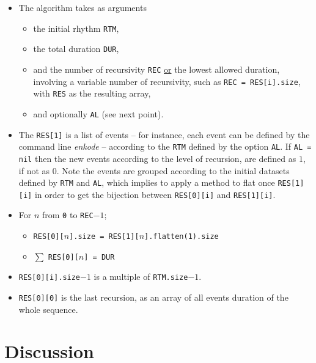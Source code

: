 \begin{itemize}[label=\textbullet]
\item The algorithm takes as arguments
\begin{itemize}[label=$\rightarrow$]
\item  the initial rhythm \texttt{RTM}, 
 \item the total duration \texttt{DUR},
 \item  and the number of recursivity \texttt{REC} \underline{or} the \hbox{lowest} allowed duration, involving a variable number of recursivity, such as \texttt{REC = RES[i].size}, with \texttt{RES} as the resulting array, 
 \item and optionally \texttt{AL} (see next point). 
 \end{itemize}
\item The \texttt{RES[1]} is a list of events -- for instance, each event can be defined by the command line \textsl{enkode}
 -- according to the \texttt{RTM} defined by the option \texttt{AL}. If \texttt{AL = nil} then the new events according to the level of recursion, are defined as $1$, if not as $0$. Note the events are grouped according to the initial datasets defined by \texttt{RTM} and \texttt{AL}, which implies to apply a method to flat once \texttt{RES[1][i]} in order to get the bijection between \texttt{RES[0][i]} and \texttt{RES[1][i]}. 
\item For $n$ from \texttt{0} to \texttt{REC$-1$};
\begin{itemize}[label=$\rightarrow$]
\item \texttt{RES[0][$n$].size = RES[1][$n$].flatten(1).size}
\item $\sum$ \texttt{RES[0][}$n$\texttt{] =  DUR}
\end{itemize}
\item \texttt{RES[0][i].size$-1$} is a multiple of \texttt{RTM.size$-1$}.

\item \texttt{RES[0][0]} is the last recursion, as an array of all events duration of the whole sequence.

\end{itemize}

\section{Discussion}
\label{Discussion}

